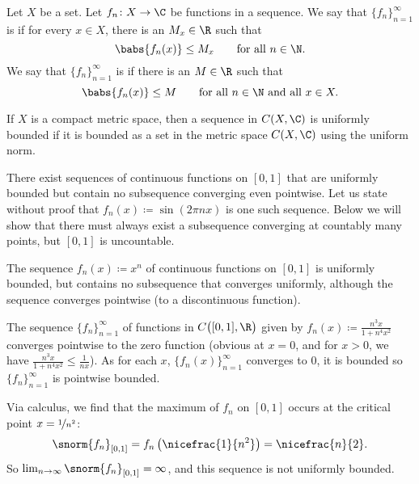 \begin{defn}
Let $X$ be a set.
Let $f_n \colon X \to \C$ be functions in a sequence.  We say that
$\{ f_n \}_{n=1}^\infty$
is \emph{} if for every $x \in X$, there is an $M_x \in \R$
such that
\begin{equation*}
\babs{f_n(x)} \leq M_x \qquad \text{for all } n \in \N .
\end{equation*}
We say that
$\{ f_n \}_{n=1}^\infty$
is \emph{} if there is an $M \in \R$
such that
\begin{equation*}
\babs{f_n(x)} \leq M \qquad \text{for all } n \in \N \text{ and all } x \in X.
\end{equation*}
\end{defn}

If $X$ is a compact metric space, then a sequence in $C(X,\C)$
is uniformly bounded if it is bounded as a set in the metric space
$C(X,\C)$ using the uniform norm.

\begin{example}
There exist sequences of 
continuous functions
on $[0,1]$ that are uniformly bounded but contain no subsequence converging
even pointwise.
Let us state without proof that $f_n(x) \coloneqq \sin (2\pi n x)$ is one
such sequence.
Below we will show that there must always exist
a subsequence converging at countably
many points, but $[0,1]$ is uncountable.
\end{example}

\begin{example}
The sequence $f_n(x) \coloneqq x^n$ of continuous functions on $[0,1]$
is uniformly bounded, but contains no subsequence that converges
uniformly,
although the sequence converges pointwise (to a discontinuous function).
\end{example}

\begin{example}
The sequence $\{ f_n \}_{n=1}^\infty$ of functions in $C\bigl([0,1],\R\bigr)$ given by
$f_n(x) \coloneqq \frac{n^3x}{1+n^4x^2}$
converges pointwise to the zero function (obvious at $x=0$, and for $x > 0$,
we have $\frac{n^3x}{1+n^4x^2} \leq \frac{1}{nx}$).
As for each $x$, $\{f_n(x)\}_{n=1}^\infty$ converges to 0, it is bounded
so $\{ f_n \}_{n=1}^\infty$ is pointwise bounded.

Via calculus, we find that the maximum of
$f_n$ on
$[0,1]$ occurs at the critical point
$x=\nicefrac{1}{n^2}$:
\begin{equation*}
\snorm{f_n}_{[0,1]}
=
f_n\left(\nicefrac{1}{n^2}\right)
= \nicefrac{n}{2} .
\end{equation*}
So $\lim_{n\to\infty} \snorm{f_n}_{[0,1]} = \infty$, and
this sequence is not uniformly bounded.
\end{example}

